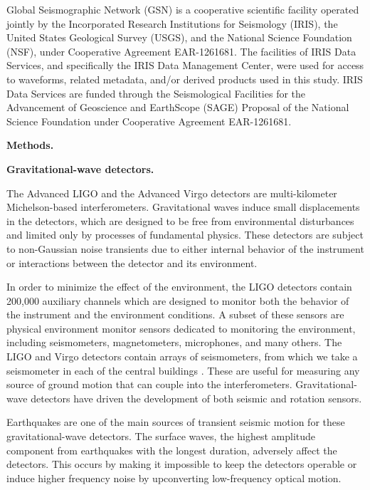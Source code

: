 \documentclass[preprint, aps, showpacs]{revtex4-1}
\begin{document}
Global Seismographic Network (GSN) is a cooperative scientific facility operated jointly by the Incorporated Research Institutions for Seismology (IRIS), the United States Geological Survey (USGS), and the National Science Foundation (NSF), under Cooperative Agreement EAR-1261681.
The facilities of IRIS Data Services, and specifically the IRIS Data Management Center, were used for access to waveforms, related metadata, and/or derived products used in this study. IRIS Data Services are funded through the Seismological Facilities for the Advancement of Geoscience and EarthScope (SAGE) Proposal of the National Science Foundation under Cooperative Agreement EAR-1261681.




\textbf{Methods.}

\textbf{Gravitational-wave detectors.}

The Advanced LIGO \cite{aligo} and the Advanced Virgo  \cite{avirgo}  detectors are multi-kilometer Michelson-based interferometers.
Gravitational waves induce small displacements in the detectors, which are designed to be free from environmental disturbances and limited only by processes of fundamental physics.
These detectors are subject to non-Gaussian noise transients due to either internal behavior of the instrument or interactions between the detector and its environment.

In order to minimize the effect of the environment, the LIGO detectors contain 200,000 auxiliary channels which are designed to monitor both the behavior of the instrument and the environment conditions.
A subset of these sensors are physical environment monitor sensors dedicated to monitoring the environment, including seismometers, magnetometers, microphones, and many others.
The LIGO and Virgo detectors contain arrays of seismometers, from which we take a seismometer in each of the central buildings \cite{AbEA2016f}. These are useful for measuring any source of ground motion that can couple into the interferometers.
Gravitational-wave detectors have driven the development of both seismic \cite{BeCa2016} and rotation \cite{VeHa2014} sensors.

Earthquakes are one of the main sources of transient seismic motion for these gravitational-wave detectors. 
The surface waves, the highest amplitude component from earthquakes with the longest duration, adversely affect the detectors. 
This occurs by making it impossible to keep the detectors operable or induce higher frequency noise by upconverting low-frequency optical motion.
\end{document}
